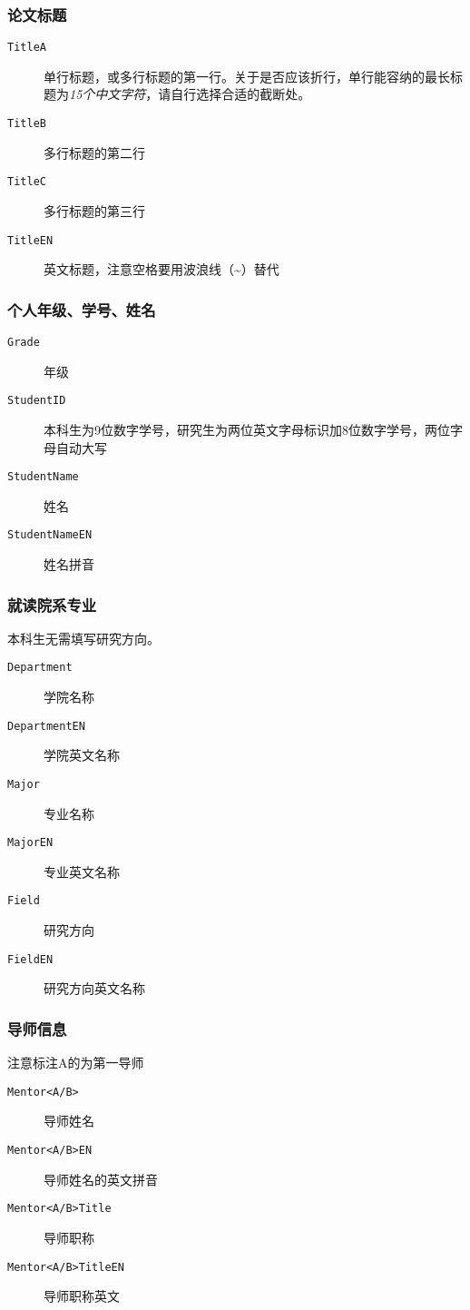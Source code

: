 \subsubsection{论文标题}
\begin{description}
    \item[\texttt{TitleA}] 单行标题，或多行标题的第一行。关于是否应该折行，单行能容纳的最长标题为\emph{15个中文字符}，请自行选择合适的截断处。
    \item[\texttt{TitleB}] 多行标题的第二行
    \item[\texttt{TitleC}] 多行标题的第三行
    \item[\texttt{TitleEN}] 英文标题，注意空格要用波浪线（\textasciitilde）替代
\end{description}

\subsubsection{个人年级、学号、姓名}
\begin{description}
    \item[\texttt{Grade}] 年级
    \item[\texttt{StudentID}] 本科生为9位数字学号，研究生为两位英文字母标识加8位数字学号，两位字母自动大写
    \item[\texttt{StudentName}] 姓名
    \item[\texttt{StudentNameEN}] 姓名拼音 
\end{description}

\subsubsection{就读院系专业}

本科生无需填写研究方向。
\begin{description}
    \item[\texttt{Department}] 学院名称
    \item[\texttt{DepartmentEN}] 学院英文名称
    \item[\texttt{Major}] 专业名称
    \item[\texttt{MajorEN}] 专业英文名称
    \item[\texttt{Field}] 研究方向
    \item[\texttt{FieldEN}] 研究方向英文名称
\end{description}

\subsubsection{导师信息}
注意标注A的为第一导师
\begin{description}
    \item[\texttt{Mentor<A/B>}] 导师姓名
    \item[\texttt{Mentor<A/B>EN}] 导师姓名的英文拼音  
    \item[\texttt{Mentor<A/B>Title}] 导师职称
    \item[\texttt{Mentor<A/B>TitleEN}] 导师职称英文
\end{description}

